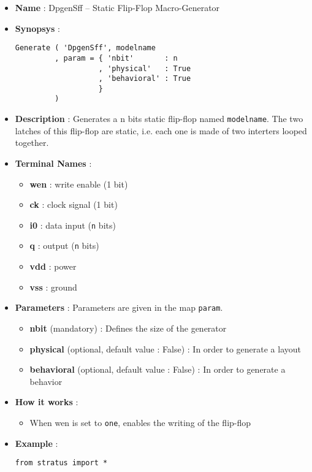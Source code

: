 \begin{itemize}
    \item \textbf{Name} : DpgenSff -- Static Flip-Flop Macro-Generator
    \item \textbf{Synopsys} :
\begin{verbatim}
Generate ( 'DpgenSff', modelname
         , param = { 'nbit'       : n
                   , 'physical'   : True         
                   , 'behavioral' : True         
                   }
         )
\end{verbatim}
    \item \textbf{Description} : Generates a n bits static flip-flop named \verb-modelname-. The two latches of this flip-flop are static, i.e. each one is made of two interters looped together.
    \item \textbf{Terminal Names} :
    \begin{itemize}
        \item \textbf{wen} : write enable (1 bit)
        \item \textbf{ck} : clock signal (1 bit)
        \item \textbf{i0} : data input (\verb-n- bits)
        \item \textbf{q} : output (\verb-n- bits)
        \item \textbf{vdd} : power
        \item \textbf{vss} : ground
    \end{itemize}
    \item \textbf{Parameters} : Parameters are given in the map \verb-param-.
    \begin{itemize}
        \item \textbf{nbit} (mandatory) : Defines the size of the generator
        \item \textbf{physical} (optional, default value : False) : In order to generate a layout        
        \item \textbf{behavioral} (optional, default value : False) : In order to generate a behavior        
    \end{itemize}
    \item \textbf{How it works} : 
    \begin{itemize}
        \item When wen is set to \verb-one-, enables the writing of the flip-flop
    \end{itemize}    
    \item \textbf{Example} :
\begin{verbatim}
from stratus import *


\end{verbatim}
\end{itemize}
